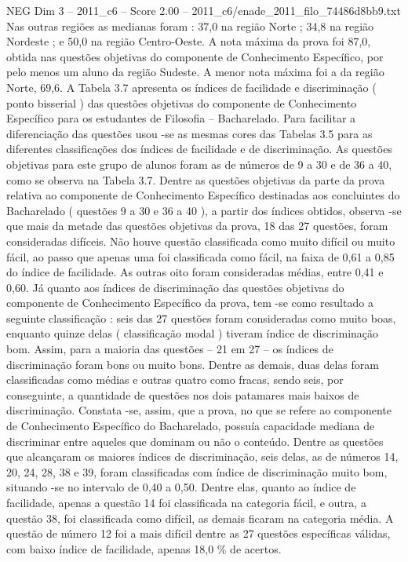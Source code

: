 \begin{textsample}{NEG Dim 3 – 2011\_c6 – Score 2.00 – 2011\_c6/enade\_2011\_filo\_74486d8bb9.txt}
Nas outras regiões as medianas foram : 37,0 na região Norte ; 34,8 na região Nordeste ; e 50,0 na região Centro-Oeste.
A nota máxima da prova foi 87,0, obtida nas questões objetivas do componente de Conhecimento Específico, por pelo menos um aluno da região Sudeste.
A menor nota máxima foi a da região Norte, 69,6.
A Tabela 3.7 apresenta os índices de facilidade e discriminação ( ponto bisserial ) das questões objetivas do componente de Conhecimento Específico para os estudantes de Filosofia – Bacharelado.
Para facilitar a diferenciação das questões usou -se as mesmas cores das Tabelas 3.5 para as diferentes classificações dos índices de facilidade e de discriminação.
As questões objetivas para este grupo de alunos foram as de números de 9 a 30 e de 36 a 40, como se observa na Tabela 3.7.
Dentre as questões objetivas da parte da prova relativa ao componente de Conhecimento Específico destinadas aos concluintes do Bacharelado ( questões 9 a 30 e 36 a 40 ), a partir dos índices obtidos, observa -se que mais da metade das questões objetivas da prova, 18 das 27 questões, foram consideradas difíceis.
Não houve questão classificada como muito difícil ou muito fácil, ao passo que apenas uma foi classificada como fácil, na faixa de 0,61 a 0,85 do índice de facilidade.
As outras oito foram consideradas médias, entre 0,41 e 0,60.
Já quanto aos índices de discriminação das questões objetivas do componente de Conhecimento Específico da prova, tem -se como resultado a seguinte classificação : seis das 27 questões foram consideradas como muito boas, enquanto quinze delas ( classificação modal ) tiveram índice de discriminação bom.
Assim, para a maioria das questões – 21 em 27 – os índices de discriminação foram bons ou muito bons.
Dentre as demais, duas delas foram classificadas como médias e outras quatro como fracas, sendo seis, por conseguinte, a quantidade de questões nos dois patamares mais baixos de discriminação.
Constata -se, assim, que a prova, no que se refere ao componente de Conhecimento Específico do Bacharelado, possuía capacidade mediana de discriminar entre aqueles que dominam ou não o conteúdo.
Dentre as questões que alcançaram os maiores índices de discriminação, seis delas, as de números 14, 20, 24, 28, 38 e 39, foram classificadas com índice de discriminação muito bom, situando -se no intervalo de 0,40 a 0,50.
Dentre elas, quanto ao índice de facilidade, apenas a questão 14 foi classificada na categoria fácil, e outra, a questão 38, foi classificada como difícil, as demais ficaram na categoria média.
A questão de número 12 foi a mais difícil dentre as 27 questões específicas válidas, com baixo índice de facilidade, apenas 18,0 \% de acertos.

\end{textsample}
